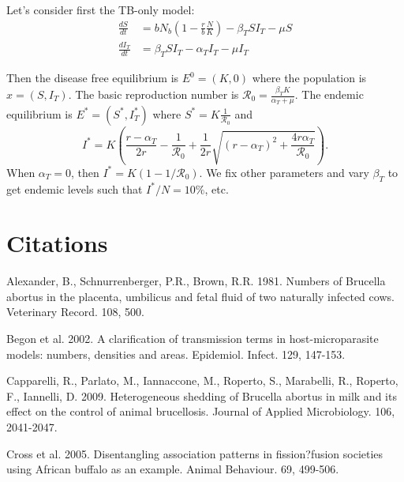\documentclass[letterpaper,12pt]{article}
\begin{document}








Let's consider first the TB-only model:
\begin{align}
\frac{dS}{dt}&=b N_b\left(1-\frac{r}{b}\frac{N}{K}\right) -\beta_T S I_T - \mu S\\
\frac{dI_T}{dt}&=\beta_T S I_T - \alpha_T I_T - \mu I_T
\end{align}

Then the disease free equilibrium is $E^0=(K,0)$ where the population is $x=(S,I_T)$. The basic reproduction number is $\mathcal{R}_0=\frac{\beta_T K}{\alpha_T + \mu}$. The endemic equilibrium is $E^*=(S^*,I_T^*)$ where $S^*=K\frac{1}{\mathcal{R}_0}$ and 
\begin{equation*}
I^*=K\left( \frac{r-\alpha_T}{2r}-\frac{1}{\mathcal{R}_0} + \frac{1}{2r}\sqrt{(r-\alpha_T)^2 + \frac{4r\alpha_T}{\mathcal{R}_0}}\right).
\end{equation*}
When $\alpha_T=0$, then $I^*=K(1-1/\mathcal{R}_0)$. We fix other parameters and vary $\beta_T$ to get endemic levels such that $I^*/N=10\%$, etc.
\pagebreak



\section*{Citations}

Alexander, B., Schnurrenberger, P.R., Brown, R.R. 1981. Numbers of Brucella abortus in the placenta, umbilicus and fetal fluid of two naturally infected cows. Veterinary Record. 108, 500. 

Begon et al. 2002. A clarification of transmission terms in host-microparasite models: numbers, densities and areas. Epidemiol. Infect. 129, 147-153.

Capparelli, R., Parlato, M., Iannaccone, M., Roperto, S., Marabelli, R., Roperto, F., Iannelli, D. 2009. Heterogeneous shedding of Brucella abortus in milk and its effect on the control of animal brucellosis. Journal of Applied Microbiology. 106, 2041-2047.

Cross et al. 2005. Disentangling association patterns in fission?fusion societies using African buffalo as an example. Animal Behaviour. 69, 499-506.
\end{document}
